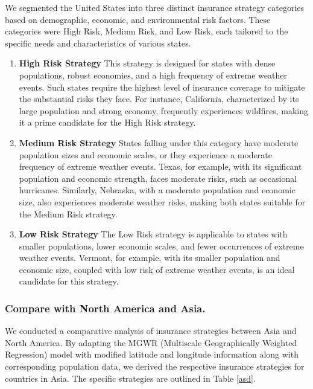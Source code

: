 \documentclass[12pt]{article}
\begin{document}
We segmented the United States into three distinct insurance strategy categories based on demographic, economic, and environmental risk factors. These categories were High Risk, Medium Risk, and Low Risk, each tailored to the specific needs and characteristics of various states.

\begin{enumerate}
    \item \textbf{High Risk Strategy}
This strategy is designed for states with dense populations, robust economies, and a high frequency of extreme weather events. Such states require the highest level of insurance coverage to mitigate the substantial risks they face. For instance, California, characterized by its large population and strong economy, frequently experiences wildfires, making it a prime candidate for the High Risk strategy.
\item \textbf{Medium Risk Strategy}
States falling under this category have moderate population sizes and economic scales, or they experience a moderate frequency of extreme weather events. Texas, for example, with its significant population and economic strength, faces moderate risks, such as occasional hurricanes. Similarly, Nebraska, with a moderate population and economic size, also experiences moderate weather risks, making both states suitable for the Medium Risk strategy.
\item \textbf{Low Risk Strategy}
The Low Risk strategy is applicable to states with smaller populations, lower economic scales, and fewer occurrences of extreme weather events. Vermont, for example, with its smaller population and economic size, coupled with low risk of extreme weather events, is an ideal candidate for this strategy.
\end{enumerate}


\subsubsection{Compare with North America and Asia.}
We conducted a comparative analysis of insurance strategies between Asia and North America. By adapting the MGWR (Multiscale Geographically Weighted Regression) model with modified latitude and longitude information along with corresponding population data, we derived the respective insurance strategies for countries in Asia. The specific strategies are outlined in Table \ref{asd}.
\end{document}
